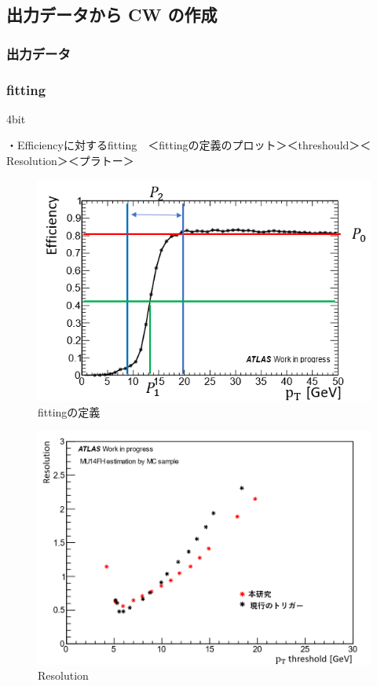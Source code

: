 \subsection{出力データから CW の作成}
\subsubsection{出力データ}
\subsubsection{fitting}


4bit


・Efficiencyに対するfitting　＜fittingの定義のプロット＞＜threshould＞＜Resolution＞＜プラトー＞\\
\begin{figure}[tb]
  \centering
  \includegraphics[clip, width=14cm]{fig/4/fitting_def.png}
  \caption{fittingの定義}
  \label{fig:fit_def}
\end{figure}

\begin{figure}[tb]
  \centering
  \includegraphics[clip, width=14cm]{fig/4/resolution_v07_v05.png}
  \caption{Resolution}
  \label{fig:Resolution}
\end{figure}

